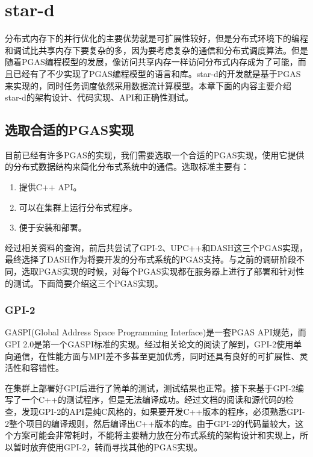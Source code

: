
\chapter{star-d}
\label{chap:stard4}

分布式内存下的并行优化的主要优势就是可扩展性较好，但是分布式环境下的编程和调试比共享内存下要复杂的多，因为要考虑复杂的通信和分布式调度算法。但是随着PGAS编程模型的发展，像访问共享内存一样访问分布式内存成为了可能，而且已经有了不少实现了PGAS编程模型的语言和库。star-d的开发就是基于PGAS来实现的，同时任务调度依然采用数据流计算模型。本章下面的内容主要介绍star-d的架构设计、代码实现、API和正确性测试。

\section{选取合适的PGAS实现}

目前已经有许多PGAS的实现，我们需要选取一个合适的PGAS实现，使用它提供的分布式数据结构来简化分布式系统中的通信。选取标准主要有：

\begin{enumerate}
	\item 提供C++ API。
	\item 可以在集群上运行分布式程序。
	\item 便于安装和部署。
\end{enumerate}

经过相关资料的查询，前后共尝试了GPI-2\citep{grunewald2013gaspi}、UPC++\citep{zheng2014upc++}和DASH\citep{furlinger2016dash}这三个PGAS实现，最终选择了DASH作为将要开发的分布式系统的PGAS支持。与之前的调研阶段不同，选取PGAS实现的时候，对每个PGAS实现都在服务器上进行了部署和针对性的测试。下面简要介绍这三个PGAS实现。

\subsection{GPI-2}

GASPI(Global Address Space Programming Interface)\citep{grunewald2013gaspi}是一套PGAS API规范，而GPI 2.0是第一个GASPI标准的实现。经过相关论文的阅读了解到，GPI-2使用单向通信，在性能方面与MPI差不多甚至更加优秀，同时还具有良好的可扩展性、灵活性和容错性。

在集群上部署好GPI后进行了简单的测试，测试结果也正常。接下来基于GPI-2编写了一个C++的测试程序，但是无法编译成功。经过文档的阅读和源代码的检查，发现GPI-2的API是纯C风格的，如果要开发C++版本的程序，必须熟悉GPI-2整个项目的编译规则，然后编译出C++版本的库。由于GPI-2的代码量较大，这个方案可能会非常耗时，不能将主要精力放在分布式系统的架构设计和实现上，所以暂时放弃使用GPI-2，转而寻找其他的PGAS实现。


